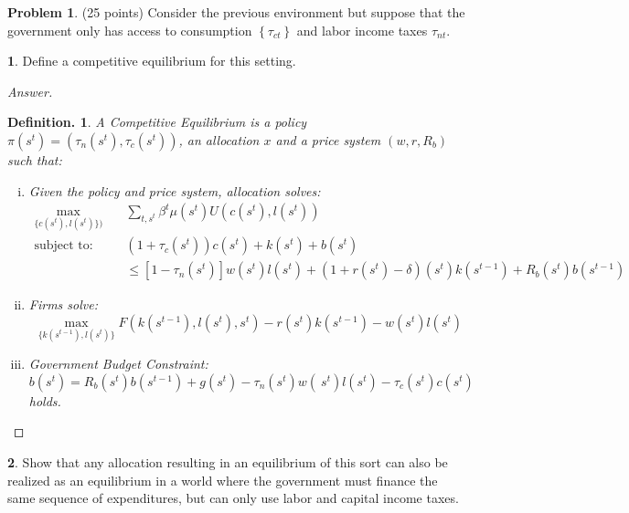 \documentclass[12pt]{article}
\newtheorem{defin}{Definition.}
\theoremstyle{definition}
\newtheorem{problem}{Problem}
\newtheorem{subproblem}{}[problem]
\begin{document}
\begin{problem}(25 points) Consider the previous environment but suppose that the government only has access to consumption $\left\{\tau_{{ct}}\right\}$ and labor income taxes $\tau_{n t}$.
\end{problem}
\begin{subproblem}
Define a competitive equilibrium for this setting.
\end{subproblem}
\begin{proof}[Answer]
\begin{defin}A Competitive Equilibrium is a policy $\pi(s^t) = \left(\tau_n(s^t), \tau_c(s^t)\right)$, an allocation $x$ and a price system $\left(w, r, R_{b}\right)$ such that:
\begin{enumerate}[(i)]
    \item Given the policy and price system, allocation solves:
 \begin{align*}
     \max_{\{c(s^{t}), l(s^t)\}) }\quad &\sum_{{t}, {s}^{t}} \beta^{t} \mu\left({s}^{{t}}\right) {U}\left(c\left(s^{t}\right), l\left(s^{t}\right)\right)\\ \text{subject to: }&
     (1+\tau_c(s^t))c\left(s^{t}\right)+k\left(s^{t}\right)+b\left(s^{t}\right) \\&\leqslant\left[1-\tau_n\left(s^{t}\right)\right] w\left(s^{t}\right) l\left(s^{t}\right)+\left(1+r\left(s^{t}\right)-\delta\right)\left(s^{t}\right) k\left(s^{t-1}\right)+R_{b}\left(s^{t}\right) b\left(s^{t-1}\right)
 \end{align*}
\item Firms solve:
$$\max_{\{k(s^{t-1}), l(s^t) \}}F(k(s^{t-1}), l(s^t), s^t) - r(s^t)k(s^{t-1}) - w(s^t)l(s^t)$$

\item Government Budget Constraint:
$$
 {b}\left( {s}^{ {t}}\right)= {R}_{ {b}}\left( {s}^{ {t}}\right)  {b}\left( {s}^{ {t}-1}\right)+ {g}\left( {s}^{ {t}}\right)-\tau_n\left( {s}^{ {t}}\right) w\left( {~s}^{ {t}}\right)  {l}\left( {s}^{ {t}}\right)-\tau_c(s^t)c\left(s^{t}\right)
$$
holds.
\end{enumerate}
\end{defin}
\end{proof}
\begin{subproblem}
Show that any allocation resulting in an equilibrium of this sort can also be realized as an equilibrium in a world where the government must finance the same sequence of expenditures, but can only use labor and capital income taxes.
\end{subproblem}
\end{document}
